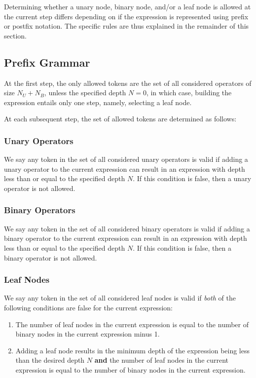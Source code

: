 \documentclass[runningheads]{llncs}
\begin{document}
Determining whether a unary node, binary node, and/or a leaf node is allowed at the current step differs depending on if the expression is represented using prefix or postfix notation. The specific rules are thus explained in the remainder of this section.

\subsection{Prefix Grammar}\label{subsec:prefix_grammar}
At the first step, the only allowed tokens are the set of all considered operators of size $N_U + N_B$, unless the specified depth $N=0$, in which case, building the expression entails only one step, namely, selecting a leaf node.
\par At each subsequent step, the set of allowed tokens are determined as follows:
\subsubsection{Unary Operators}
We say any token in the set of all considered unary operators is valid if adding a unary operator to the current expression can result in an expression with depth less than or equal to the specified depth $N$. If this condition is false, then a unary operator is not allowed.
\subsubsection{Binary Operators}
We say any token in the set of all considered binary operators is valid if adding a binary operator to the current expression can result in an expression with depth less than or equal to the specified depth $N$. If this condition is false, then a binary operator is not allowed.
\subsubsection{Leaf Nodes}
We say any token in the set of all considered leaf nodes is valid if \emph{both} of the following conditions are false for the current expression:
\begin{enumerate}
    \item The number of leaf nodes in the current expression is equal to the number of binary nodes in the current expression minus 1.
    \item Adding a leaf node results in the minimum depth of the expression being less than the desired depth $N$ \textbf{and} the number of leaf nodes in the current expression is equal to the number of binary nodes in the current expression.
\end{enumerate}
\end{document}
